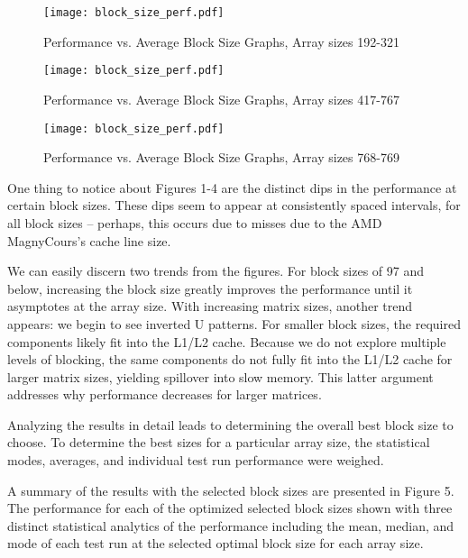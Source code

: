 \documentclass{article} %
\begin{document}
\begin{figure}
 \noindent
 \hspace*{-1.5in}
 \texttt{[image: block\_size\_perf.pdf]}
 \caption{Performance vs. Average Block Size Graphs, Array sizes 192-321}
\end{figure}

\begin{figure}
 \noindent
 \hspace*{-1.5in}
 \texttt{[image: block\_size\_perf.pdf]}
 \caption{Performance vs. Average Block Size Graphs, Array sizes 417-767}
\end{figure}

\begin{figure}
 \noindent
 \hspace*{-1.5in}
 \texttt{[image: block\_size\_perf.pdf]}
 \caption{Performance vs. Average Block Size Graphs, Array sizes 768-769}
\end{figure}

One thing to notice about Figures 1-4 are the distinct dips in the performance at
certain block sizes. These dips seem to appear at consistently spaced intervals, for
all block sizes -- perhaps, this occurs due to misses due to the AMD MagnyCours's
cache line size.

We can easily discern two trends from the figures. For block sizes of 97 and below,
increasing the block size greatly improves the performance until it asymptotes at
the array size. With increasing matrix sizes, another trend appears: we begin
to see inverted U patterns. For smaller block sizes, the required components likely
fit into the L1/L2 cache. Because we do not explore multiple levels of blocking, the
same components do not fully fit into the L1/L2 cache for larger matrix sizes, yielding
spillover into slow memory. This latter argument addresses why performance decreases
for larger matrices.

Analyzing the results in detail leads to determining the overall best block size
to choose. To determine the best sizes for a particular array size, the
statistical modes, averages, and individual test run performance were weighed.

A summary of the results with the selected block sizes are presented in Figure 5.
The performance for each of the optimized selected block sizes shown with three
distinct statistical analytics of the performance including the mean, median,
and mode of each test run at the selected optimal block size for each array size.
\end{document}
